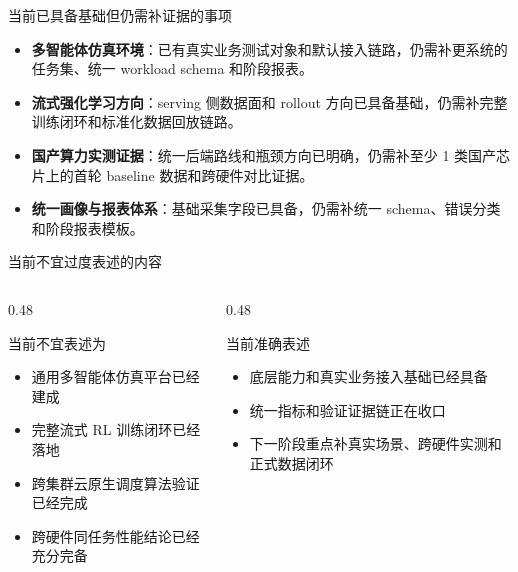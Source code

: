 \documentclass[aspectratio=169,11pt]{ctexbeamer}
\begin{document}
\begin{frame}{当前已具备基础但仍需补证据的事项}
  \begin{itemize}
    \item \textbf{多智能体仿真环境}：已有真实业务测试对象和默认接入链路，仍需补更系统的任务集、统一 workload schema 和阶段报表。
    \item \textbf{流式强化学习方向}：serving 侧数据面和 rollout 方向已具备基础，仍需补完整训练闭环和标准化数据回放链路。
    \item \textbf{国产算力实测证据}：统一后端路线和瓶颈方向已明确，仍需补至少 1 类国产芯片上的首轮 baseline 数据和跨硬件对比证据。
    \item \textbf{统一画像与报表体系}：基础采集字段已具备，仍需补统一 schema、错误分类和阶段报表模板。
  \end{itemize}
\end{frame}

\begin{frame}{当前不宜过度表述的内容}
  \begin{columns}[T]
    \begin{column}{0.48\textwidth}
      \begin{alertblock}{当前不宜表述为}
        \begin{itemize}
          \item 通用多智能体仿真平台已经建成
          \item 完整流式 RL 训练闭环已经落地
          \item 跨集群云原生调度算法验证已经完成
          \item 跨硬件同任务性能结论已经充分完备
        \end{itemize}
      \end{alertblock}
    \end{column}
    \begin{column}{0.48\textwidth}
      \begin{block}{当前准确表述}
        \begin{itemize}
          \item 底层能力和真实业务接入基础已经具备
          \item 统一指标和验证证据链正在收口
          \item 下一阶段重点补真实场景、跨硬件实测和正式数据闭环
        \end{itemize}
      \end{block}
    \end{column}
  \end{columns}
\end{frame}
\end{document}
